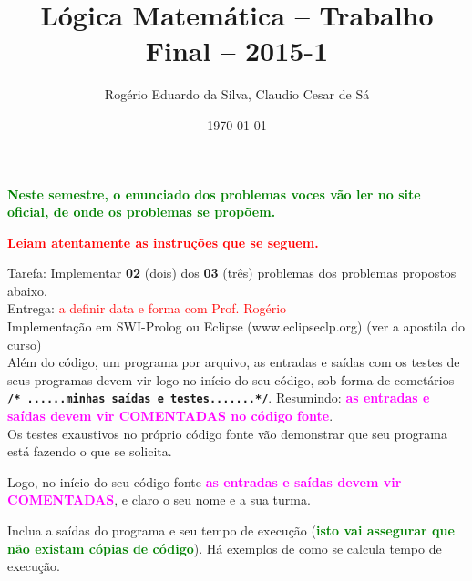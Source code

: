 \documentclass[a4paper,12pt]{article}
\title{Lógica Matemática -- Trabalho Final -- 2015-1}
\author{Rogério Eduardo da Silva, Claudio Cesar de Sá}
\date{\today}
\begin{document}
\maketitle

\begin{flushleft}





\vspace{0.5cm}
  {\bf \textcolor{green}{Neste semestre, o enunciado dos problemas voces vão ler no site oficial, de onde os problemas se propõem.}}


\vspace{0.5cm}
 {\bf \textcolor{red}{Leiam atentamente as
instruções que se seguem.}}


\vspace{0.5cm}
 Tarefa: Implementar \textbf{02} (dois) dos  \textbf{03} (três)  problemas dos problemas propostos abaixo.\\
Entrega: \textcolor{red}{a definir data e forma com Prof. Rogério} \\ 

\vspace{0.5cm}
 Implementação em SWI-Prolog ou Eclipse (www.eclipseclp.org) (ver a apostila do curso)\\

\vspace{0.5cm}
 Além do código, um programa por arquivo, as entradas e saídas com os testes de seus programas devem vir logo no início do seu código,  sob forma de cometários \textbf{\texttt{/* ......minhas saídas e testes.......*/}}. Resumindo: 
\textcolor{magenta}{\textbf{as entradas e saídas devem vir COMENTADAS no código fonte}}.\\

\vspace{0.5cm}
 Os testes exaustivos no próprio código fonte vão demonstrar que seu programa está fazendo o que se solicita.

\vspace{0.5cm}
 Logo, no início do seu código fonte
\textcolor{magenta}{\textbf{as entradas e saídas devem vir COMENTADAS}},
e claro o seu nome e a sua turma.

\vspace{0.5cm}
 Inclua a saídas do programa e seu tempo de execução (\textbf{\textcolor{green}{isto vai assegurar que não existam cópias de código}}). Há exemplos de como se calcula tempo de execução.


\end{flushleft}
\end{document}
